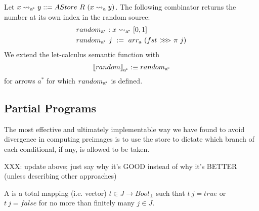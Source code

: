 \documentclass[preprint]{sigplanconf}
\newcommand{\arrow}{\rightsquigarrow}
\newcommand{\arrowarr}{\ensuremath{arr}}
\newcommand{\arrowcomp}{\ensuremath{{>}\mspace{-6mu}{>}\mspace{-6mu}{>}}}
\newcommand{\gen}{_\mathrm{a}}
\newcommand{\genc}{_\mathrm{a^{\mspace{-2mu}*}}}
\begin{document}
Let $x \arrow\genc y ::= AStore~R~(x \arrow\gen y)$.
The following combinator returns the number at its own index in the random source:
\begin{equation}
\begin{aligned}
	&random\genc : x \arrow\genc [0,1] \\
	&random\genc~j \ := \ \arrowarr\gen~(fst~\arrowcomp~\pi~j)
\end{aligned}
\end{equation}
We extend the let-calculus semantic function with
\begin{equation}
	\meaningof{random}\genc :\equiv random\genc
\end{equation}
for arrows $a^*$ for which $random\genc$ is defined.

\subsection{Partial Programs}
\label{sec:partial-programs}

The most effective and ultimately implementable way we have found to avoid divergence in computing preimages is to use the store to dictate which branch of each conditional, if any, is allowed to be taken.

XXX: update above; just say why it's GOOD instead of why it's BETTER (unless describing other approaches)

\begin{definition}
A  is a total mapping (i.e. vector) $t \in J \to Bool_\bot$ such that $t~j = true$ or $t~j = false$ for no more than finitely many $j \in J$.
\end{definition}
\end{document}

